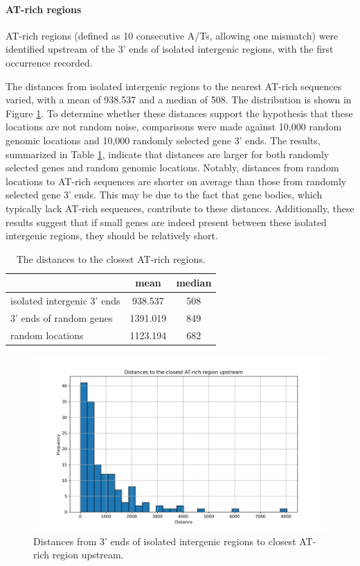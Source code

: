 \paragraph{AT-rich regions}

AT-rich regions (defined as 10 consecutive A/Ts, allowing one mismatch) were identified upstream of the 3' ends of isolated intergenic regions,
with the first occurrence recorded.

The distances from isolated intergenic regions to the nearest AT-rich sequences varied, with a mean of 938.537 and a median of 508.
The distribution is shown in Figure \ref{fig:distancesATrich}.
To determine whether these distances support the hypothesis that these locations are not random noise,
comparisons were made against 10,000 random genomic locations and 10,000 randomly selected gene 3' ends.
The results, summarized in Table \ref{tab:distancesATrich},
indicate that distances are larger for both randomly selected genes and random genomic locations.
Notably, distances from random locations to AT-rich sequences are shorter on average than those from randomly selected gene 3' ends.
This may be due to the fact that gene bodies, which typically lack AT-rich sequences, contribute to these distances.
Additionally, these results suggest that if small genes are indeed present between these isolated intergenic regions,
they should be relatively short.

\begin{table}[htbp]
  \centering
  \begin{tabular}{l|cc}
    \toprule
     & mean & median  \\
    \midrule
    isolated intergenic 3' ends & 938.537 & 508 \\
    3' ends of random genes & 1391.019 & 849 \\
    random locations & 1123.194 & 682 \\
    \bottomrule
  \end{tabular}
  \caption{The distances to the closest AT-rich regions.}
  \label{tab:distancesATrich}
\end{table}

\begin{figure}
  \centering
  \includegraphics[width=\linewidth]{images/histogramATrich.png}
  \caption{Distances from 3' ends of isolated intergenic regions to closest AT-rich region upstream.}
  \label{fig:distancesATrich}
\end{figure}

